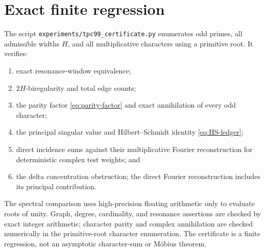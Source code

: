 \section{Exact finite regression}
\label{sec:regression}

The script
\texttt{experiments/tpc99\_certificate.py} enumerates odd primes,
all admissible widths \(H\), and all multiplicative characters using
a primitive root.  It verifies:
\begin{enumerate}[leftmargin=2em]
\item exact resonance-window equivalence;
\item \(2H\)-biregularity and total edge counts;
\item the parity factor
  \eqref{eq:parity-factor} and exact annihilation of every odd
  character;
\item the principal singular value and
  Hilbert--Schmidt identity \eqref{eq:HS-ledger};
\item direct incidence sums against their multiplicative Fourier
  reconstruction for deterministic complex test weights; and
\item the delta concentration obstruction; the direct Fourier
  reconstruction includes its principal contribution.
\end{enumerate}
The spectral comparison uses high-precision floating arithmetic only
to evaluate roots of unity.  Graph, degree, cardinality, and
resonance assertions are checked by exact integer arithmetic;
character parity and complex annihilation are checked numerically
in the primitive-root character enumeration.  The
certificate is a finite regression, not an asymptotic character-sum
or M\"obius theorem.
